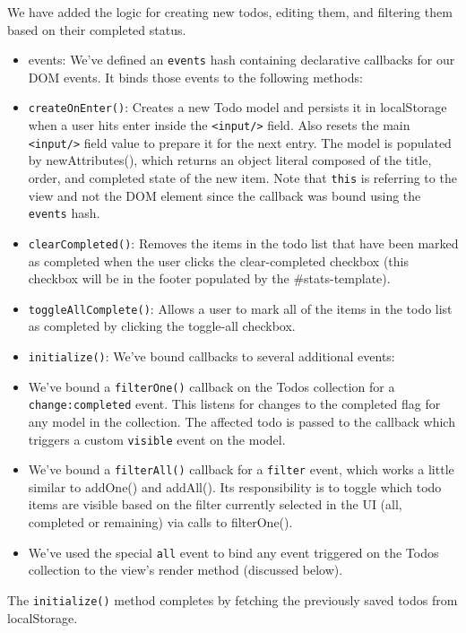 \documentclass[9pt]{book}
\begin{document}
We have added the logic for creating new todos, editing them, and
filtering them based on their completed status.

\begin{itemize}
\item
  events: We've defined an \texttt{events} hash containing declarative
  callbacks for our DOM events. It binds those events to the following
  methods:
\item
  \texttt{createOnEnter()}: Creates a new Todo model and persists it in
  localStorage when a user hits enter inside the
  \texttt{\textless{}input/\textgreater{}} field. Also resets the main
  \texttt{\textless{}input/\textgreater{}} field value to prepare it for
  the next entry. The model is populated by newAttributes(), which
  returns an object literal composed of the title, order, and completed
  state of the new item. Note that \texttt{this} is referring to the
  view and not the DOM element since the callback was bound using the
  \texttt{events} hash.
\item
  \texttt{clearCompleted()}: Removes the items in the todo list that
  have been marked as completed when the user clicks the clear-completed
  checkbox (this checkbox will be in the footer populated by the
  \#stats-template).
\item
  \texttt{toggleAllComplete()}: Allows a user to mark all of the items
  in the todo list as completed by clicking the toggle-all checkbox.
\item
  \texttt{initialize()}: We've bound callbacks to several additional
  events:
\item
  We've bound a \texttt{filterOne()} callback on the Todos collection
  for a \texttt{change:completed} event. This listens for changes to the
  completed flag for any model in the collection. The affected todo is
  passed to the callback which triggers a custom \texttt{visible} event
  on the model.
\item
  We've bound a \texttt{filterAll()} callback for a \texttt{filter}
  event, which works a little similar to addOne() and addAll(). Its
  responsibility is to toggle which todo items are visible based on the
  filter currently selected in the UI (all, completed or remaining) via
  calls to filterOne().
\item
  We've used the special \texttt{all} event to bind any event triggered
  on the Todos collection to the view's render method (discussed below).
\end{itemize}

The \texttt{initialize()} method completes by fetching the previously
saved todos from localStorage.
\end{document}
